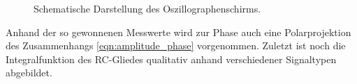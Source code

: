 \begin{figure}
	\centering
	\vspace{0.615ex}
	\begin{tikzpicture}
		
	\end{tikzpicture}
	\vspace{1.23ex}
	\caption{Schematische Darstellung des Oszillographenschirms.}
	\label{fig:ab}
\end{figure}

Anhand der so gewonnenen Messwerte wird zur Phase auch eine Polarprojektion des Zusammenhangs
\eqref{eqn:amplitude_phase} vorgenommen. Zuletzt ist noch die Integralfunktion des
RC\hspace{0.15ex}-Gliedes qualitativ anhand verschiedener Signaltypen abgebildet.
